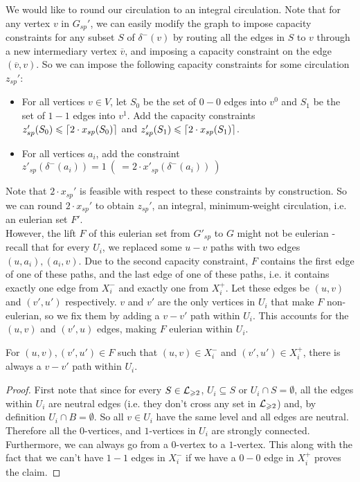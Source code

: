 \documentclass[./main.tex]{subfiles}
\DeclarePairedDelimiter\ceil{\lceil}{\rceil}
\begin{document}
		We would like to round our circulation to an integral circulation. 
		Note that for any vertex $v$ in $G_{sp}'$, we can easily modify the graph to impose capacity constraints for any subset $S$ of $\delta^-(v)$ by routing all the edges in $S$ to $v$ through a new intermediary vertex $\overline{v}$, and imposing a capacity constraint on the edge $(\overline{v},v)$. 
	So we can impose the following capacity constraints for some circulation $z_{sp}'$:
		\begin{itemize}[-]
		\item For all vertices $v\in V$, let $S_0$ be the set of $0-0$ edges into $v^0$ and $S_1$ be the set of $1-1$ edges into $v^1$. 
				Add the capacity constraints $z'_{sp}(S_0)\leqslant \ceil{2\cdot x_{sp}(S_0)}$ and $z'_{sp}(S_1)\leqslant \ceil{2\cdot x_{sp}(S_1)}$.
		\item For all vertices $a_i$, add the constraint $z'_{sp}(\delta^-(a_i)) = 1\  (\ = 2\cdot x'_{sp}(\delta^-(a_i))\ )$
		\end{itemize}
		Note that $2\cdot x_{sp}'$ is feasible with respect to these constraints by construction. 
		So we can round $2\cdot x_{sp}'$ to obtain $z_{sp}'$, an integral, minimum-weight circulation, i.e. an eulerian set $F'$.\vspace{2mm}
		\\However, the lift $F$ of this eulerian set from $G'_{sp}$ to $G$ might not be eulerian - recall that for every $U_i$, we replaced some $u-v$ paths with two edges $(u,a_i),(a_i,v)$. 
		Due to the second capacity constraint, $F$ contains the first edge of one of these paths, and the last edge of one of these paths, i.e. it contains exactly one edge from $X_i^-$ and exactly one from $X_i^+$. 
		Let these edges be $(u,v)$ and $(v',u')$ respectively. 
		$v$ and $v'$ are the only vertices in $U_i$ that make $F$ non-eulerian, so we fix them by adding a $v-v'$ path within $U_i$. This accounts for the $(u,v)$ and $(v',u
		)$ edges, making $F$ eulerian within $U_i$.\vspace{1mm}
		\begin{claim}
		For $(u,v),(v',u')\in F$ such that $(u,v)\in X^-_i$ and $(v',u')\in X^+_i$, there is always a $v-v'$ path within $U_i$.
		\end{claim}
		\begin{proof}
			First note that since for every $S\in \mathcal{L}_{\geqslant 2}$, $U_i\subseteq S$ or $U_i\cap S = \emptyset$, all the edges within $U_i$ are neutral edges (i.e. they don't cross any set in $\mathcal{L}_{\geqslant 2}$) and, by definition $U_i \cap B = \emptyset$.
			So all $v \in U_i$ have the same level and all edges are neutral.
			Therefore all the $0$-vertices, and $1$-vertices in $U_i$ are strongly connected. Furthermore, we can always go from a $0$-vertex to a $1$-vertex. This along with the fact that we can't have $1-1$ edges in $X_i^-$ if we have a $0-0$ edge in $X_i^+$ proves the claim.
		\end{proof}
\end{document}
